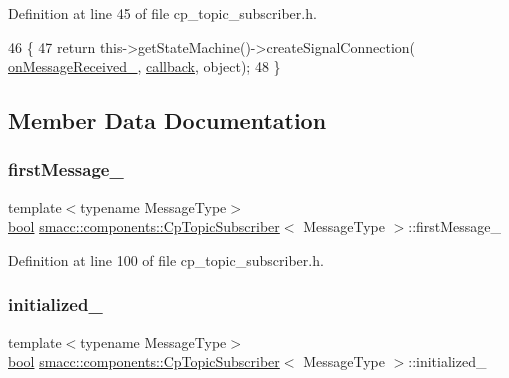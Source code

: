 Definition at line 45 of file cp\+\_\+topic\+\_\+subscriber.\+h.


\begin{DoxyCode}
46     \{
47         \textcolor{keywordflow}{return} this->getStateMachine()->createSignalConnection(
      \hyperlink{classsmacc_1_1components_1_1CpTopicSubscriber_aeec04e64cad880bd49d401c2a474c6e9}{onMessageReceived\_}, \hyperlink{servers_2opencv__perception__node_2opencv__perception__node_8cpp_a050e697bd654facce10ea3f6549669b3}{callback}, \textcolor{keywordtype}{object});
48     \}
\end{DoxyCode}


\subsection{Member Data Documentation}
\mbox{\label{classsmacc_1_1components_1_1CpTopicSubscriber_aadbaf8c0f0a2a5bea38f41356528f41c}} 
\subsubsection{\texorpdfstring{first\+Message\+\_\+}{firstMessage\_}}
{\footnotesize\ttfamily template$<$typename Message\+Type$>$ \\
\hyperlink{classbool}{bool} \hyperlink{classsmacc_1_1components_1_1CpTopicSubscriber}{smacc\+::components\+::\+Cp\+Topic\+Subscriber}$<$ Message\+Type $>$\+::first\+Message\+\_\+\hspace{0.3cm}{\ttfamily [private]}}



Definition at line 100 of file cp\+\_\+topic\+\_\+subscriber.\+h.

\mbox{\label{classsmacc_1_1components_1_1CpTopicSubscriber_a666e60629820ef146ade691a36c41e0a}} 
\subsubsection{\texorpdfstring{initialized\+\_\+}{initialized\_}}
{\footnotesize\ttfamily template$<$typename Message\+Type$>$ \\
\hyperlink{classbool}{bool} \hyperlink{classsmacc_1_1components_1_1CpTopicSubscriber}{smacc\+::components\+::\+Cp\+Topic\+Subscriber}$<$ Message\+Type $>$\+::initialized\+\_\+\hspace{0.3cm}{\ttfamily [private]}}



